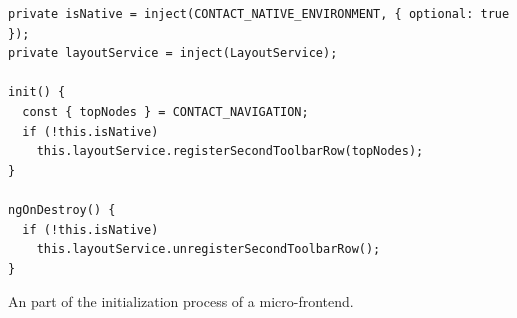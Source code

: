 \ifshowListings
\begin{listing}[H]
  \begin{verbatim}
private isNative = inject(CONTACT_NATIVE_ENVIRONMENT, { optional: true });
private layoutService = inject(LayoutService);

init() {
  const { topNodes } = CONTACT_NAVIGATION;
  if (!this.isNative)
    this.layoutService.registerSecondToolbarRow(topNodes);
}

ngOnDestroy() {
  if (!this.isNative)
    this.layoutService.unregisterSecondToolbarRow();
}
  \end{verbatim}
  \caption{An part of the initialization process of a micro-frontend.}\label{code:applied-methods:communication-patterns:initialization-logic-micro-frontend}
\end{listing}
\fi

